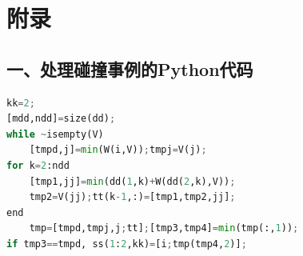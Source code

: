 \chapter{附录}

\section*{一、处理碰撞事例的Python代码}
\begin{lstlisting}[language=python,caption={模拟退火算法},label=Code:101]
kk=2;
[mdd,ndd]=size(dd);
while ~isempty(V)
    [tmpd,j]=min(W(i,V));tmpj=V(j);
for k=2:ndd
    [tmp1,jj]=min(dd(1,k)+W(dd(2,k),V));
    tmp2=V(jj);tt(k-1,:)=[tmp1,tmp2,jj];
end
    tmp=[tmpd,tmpj,j;tt];[tmp3,tmp4]=min(tmp(:,1));
if tmp3==tmpd, ss(1:2,kk)=[i;tmp(tmp4,2)];
 \end{lstlisting}
 
 \newpage
 
